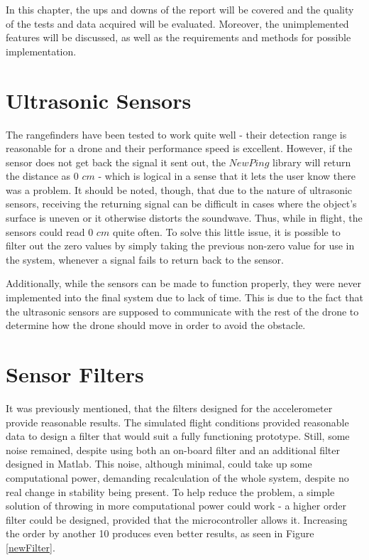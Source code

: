 In this chapter, the ups and downs of the report will be covered and the quality of the tests and data acquired will be evaluated. Moreover, the unimplemented features will be discussed, as well as the requirements and methods for possible implementation.
\section{Ultrasonic Sensors}
The rangefinders have been tested to work quite well - their detection range is reasonable for a drone and their performance speed is excellent. However, if the sensor does not get back the signal it sent out, the $NewPing$ library will return the distance as 0 $cm$ - which is logical in a sense that it lets the user know there was a problem. It should be noted, though, that due to the nature of ultrasonic sensors, receiving the returning signal can be difficult in cases where the object's surface is uneven or it otherwise distorts the soundwave. Thus, while in flight, the sensors could read 0 $cm$ quite often.
To solve this little issue, it is possible to filter out the zero values by simply taking the previous non-zero value for use in the system, whenever a signal fails to return back to the sensor.

Additionally, while the sensors can be made to function properly, they were never implemented into the final system due to lack of time. This is due to the fact that the ultrasonic sensors are supposed to communicate with the rest of the drone to determine how the drone should move in order to avoid the obstacle.
\section{Sensor Filters}
It was previously mentioned, that the filters designed for the accelerometer provide reasonable results. The simulated flight conditions provided reasonable data to design a filter that would suit a fully functioning prototype. 
Still, some noise remained, despite using both an on-board filter and an additional filter designed in Matlab. This noise, although minimal, could take up some computational power, demanding recalculation of the whole system, despite no real change in stability being present.
To help reduce the problem, a simple solution of throwing in more computational power could work - a higher order filter could be designed, provided that the microcontroller allows it.
Increasing the order by another 10 produces even better results, as seen in Figure \ref{newFilter}.

